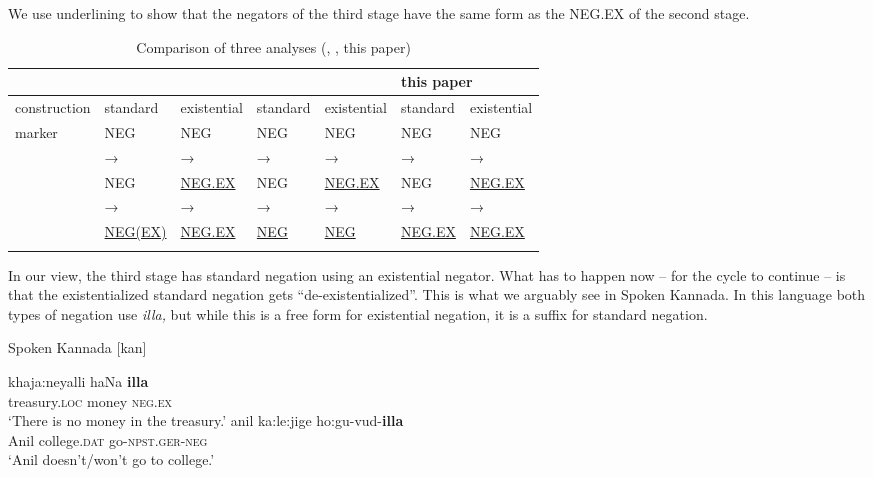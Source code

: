 ﻿\documentclass[output=paper]{langsci/langscibook}
\begin{document}
We use underlining  to show that the negators of the third stage have the same
form as the NEG.EX of the second stage.
%
\begin{table}\begin{footnotesize}
\begin{tabularx}{\textwidth}{l l l l l l l}
\lsptoprule
&\multicolumn{2}{l}{\cite{Croft1991}}&\multicolumn{2}{l}{\cite{Veselinova2014}}&\multicolumn{2}{l}{this
paper}\\\midrule
construction & standard & existential & standard & existential & standard &
existential\\\midrule
marker  &NEG        &NEG        &NEG        &NEG        &NEG        &NEG\\
        &→          &→          &→          &→          &→          &→\\
        &NEG        &\uline{NEG.EX}     &NEG        &\uline{NEG.EX}
        &NEG &\uline{NEG.EX}\\
        &→          &→          &→          &→          &→          &→\\
        &\uline{NEG(EX)}    &\uline{NEG.EX}     &\uline{NEG}
        &\uline{NEG}     &\uline{NEG.EX} &\uline{NEG.EX}\\
\lspbottomrule
\end{tabularx}\end{footnotesize}
\caption{Comparison of three analyses (\citealt{Croft1991}, \citealt{Veselinova2014}, this paper)}
\label{tab:int-three-analyses}
\end{table}
%
In our view, the third stage has standard negation using an existential
negator. What has to happen now -- for the cycle to continue -- is that the
existentialized standard negation gets ``de-existentialized''. This is what
we arguably see in Spoken Kannada. In this language both types of negation
use \textit{illa,} but while this is a free form for existential negation,
it is a suffix for standard negation.
%
\begin{exe}\ex\label{ex:int-kannada-money-college}
           Spoken Kannada [kan] 
    \begin{xlist}
    \ex\label{ex:int-kannada-money}
    \gll khaja:neyalli    haNa    \textbf{illa} \\
    treasury.\textsc{loc}    money  \textsc{neg.ex} \\
    \glt `There is no money in the treasury.'
    \ex\label{ex:int-kannada-college}
    \gll anil  ka:le:jige  ho:gu-vud-\textbf{illa}\\
    Anil  college.\textsc{dat}  go-\textsc{npst.ger-neg}\\
    \glt `Anil doesn't/won't go to college.'
    \end{xlist}\end{exe}
\end{document}

